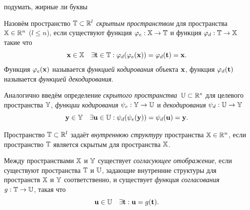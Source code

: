 {\color{red} подумать, жирные ли буквы}

\begin{definition}
	Назовём пространство $\mathbb{T} \subset \mathbb{R}^l$ \textit{скрытым пространством} для пространства $\mathbb{X} \in \mathbb{R}^n$ ($l \leq n$), если существуют функция $\varphi_e: \mathbb{X} \to \mathbb{T}$ и функция $\varphi_d: \mathbb{T}  \to \mathbb{X}$ такие что
	\[
	\mathbf{x} \in \mathbb{X} \quad \exists \mathbf{t} \in \mathbb{T}: \varphi_d (\varphi_e(\mathbf{x})) = \varphi_d(\mathbf{t}) = \mathbf{x}.
	\]
	Функция $\varphi_e(\mathbf{x})$ называется \textit{функцией кодирования} объекта $\mathbf{x}$, функция $\varphi_d(\mathbf{t})$  называется \textit{функцией декодирования}. 
	
	Аналогично введём определение \textit{скрытого пространства}~$\mathbb{U} \subset \mathbb{R}^s$ для целевого пространства $\mathbb{Y}$, \textit{функции кодирования} $\psi_e: \mathbb{Y} \to \mathbb{U}$ и \textit{декодирования} $\psi_d: \mathbb{U}  \to \mathbb{Y}$
	\[
	 \mathbf{y} \in \mathbb{Y} \quad  \exists \mathbf{u} \in \mathbb{U}: \psi_d (\psi_e(\mathbf{y})) = \psi_d(\mathbf{u}) = \mathbf{y}.
	\]
\end{definition}

\begin{definition}
	Пространство $\mathbb{T} \subset \mathbb{R}^l$ задаёт \textit{внутреннюю структуру} пространства $\mathbb{X} \in \mathbb{R}^n$, если пространство $\mathbb{T}$ является скрытым для пространства $\mathbb{X}$.
\end{definition}

\begin{definition}
	Между пространствами $\mathbb{X}$ и $\mathbb{Y}$ существует \textit{согласующее отображение}, если существуют пространства $\mathbb{T}$ и $\mathbb{U}$, задающие внутренние структуры для пространств $\mathbb{X}$ и $\mathbb{Y}$ соответственно, и существует \textit{функция согласования} $g: \mathbb{T} \rightarrow \mathbb{U}$, такая что
	\[
	\mathbf{u} \in \mathbb{U} \quad \exists \mathbf{t}:  \mathbf{u} = g(\mathbf{t}).
	\]
\end{definition}


